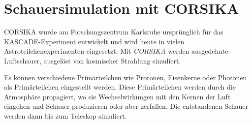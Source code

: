 \section{Schauersimulation mit CORSIKA}

CORSIKA wurde am Forschungszentrum Karlsruhe ursprünglich für das KASCADE-Experiment entwickelt und wird heute in vielen Astroteilchenexperimenten eingesetzt.
Mit \textit{CORSIKA} werden ausgedehnte Luftschauer, ausgelöst von kosmischer Strahlung simuliert.

Es können verschiedene Primärteilchen wie Protonen, Eisenkerne oder Photonen als Primärteilchen eingestellt werden.
Diese Primärteilchen werden durch die Atmosphäre propagiert, wo sie Wechselwirkungen mit den Kernen der Luft eingehen und Schauer produzieren oder aber zerfallen.
Die entstandenen Schauer werden dann bis zum Teleskop simuliert.



